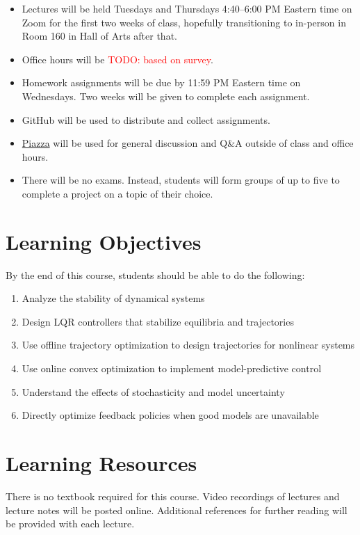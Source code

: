 \documentclass[11pt,letterpaper]{article}
\newcommand{\todo}[1]{\textcolor{red}{TODO: #1}}
\begin{document}
\begin{itemize}
	\item Lectures will be held Tuesdays and Thursdays 4:40--6:00 PM Eastern time on Zoom for the first two weeks of class, hopefully transitioning to in-person in Room 160 in Hall of Arts after that.
	\item Office hours will be \todo{based on survey}.
	\item Homework assignments will be due by 11:59 PM Eastern time on Wednesdays. Two weeks will be given to complete each assignment.
	\item GitHub will be used to distribute and collect assignments.
	\item \href{piazza.com/cmu/spring2022/16745/home}{Piazza} will be used for general discussion and Q\&A outside of class and office hours.
	\item There will be no exams. Instead, students will form groups of up to five to complete a project on a topic of their choice.
\end{itemize}

\section*{Learning Objectives}
By the end of this course, students should be able to do the following:
\begin{enumerate}
	\item Analyze the stability of dynamical systems
	\item Design LQR controllers that stabilize equilibria and trajectories
	\item Use offline trajectory optimization to design trajectories for nonlinear systems
	\item Use online convex optimization to implement model-predictive control
	\item Understand the effects of stochasticity and model uncertainty
	\item Directly optimize feedback policies when good models are unavailable
\end{enumerate}

\section*{Learning Resources}

There is no textbook required for this course. Video recordings of lectures and lecture notes will be posted online. Additional references for further reading will be provided with each lecture.
\end{document}

